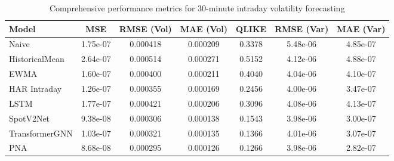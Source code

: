 \documentclass[journal]{IEEEtran}
\begin{document}
\begin{table*}[!t]
\centering
\caption{Comprehensive performance metrics for 30-minute intraday volatility forecasting}
\label{tab:comprehensive_results}
\begin{tabular}{@{}lS[table-format=1.2e-1]S[table-format=1.6]S[table-format=1.6]S[table-format=1.4]S[table-format=1.2e-1]S[table-format=1.2e-1]@{}}
\toprule
{Model} & {MSE} & {RMSE (Vol)} & {MAE (Vol)} & {QLIKE} & {RMSE (Var)} & {MAE (Var)} \\
\midrule
{}Naive & 1.75e-07 & 0.000418 & 0.000209 & 0.3378 & 5.48e-06 & 4.85e-07 \\
HistoricalMean & 2.64e-07 & 0.000514 & 0.000271 & 0.5152 & 4.12e-06 & 4.88e-07 \\
EWMA & 1.60e-07 & 0.000400 & 0.000211 & 0.4040 & 4.04e-06 & 4.10e-07 \\
HAR Intraday & 1.26e-07 & 0.000355 & 0.000169 & 0.2456 & 4.00e-06 & 3.47e-07 \\
LSTM & 1.77e-07 & 0.000421 & 0.000206 & 0.3096 & 4.08e-06 & 4.13e-07 \\
SpotV2Net & 9.38e-08 & 0.000306 & 0.000138 & 0.1543 & 3.98e-06 & 3.00e-07 \\
TransformerGNN & 1.03e-07 & 0.000321 & 0.000135 & 0.1366 & 4.01e-06 & 3.07e-07 \\
PNA & 8.68e-08 & 0.000295 & 0.000126 & 0.1266 & 3.98e-06 & 2.82e-07 \\
\bottomrule
\end{tabular}
\end{table*}
\end{document}
